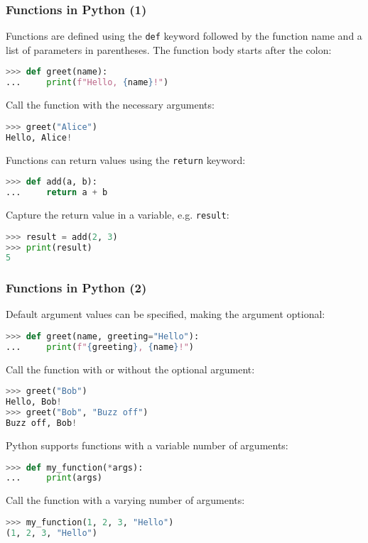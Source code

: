 \begin{frame}[fragile]
  \frametitle{Functions in Python (1)}
  Functions are defined using the \lstinline{def} keyword followed by the function name and a list of parameters in parentheses. The function body starts after the colon:
  \begin{lstlisting}[language=Python, numbers=none]
>>> def greet(name):
...     print(f"Hello, {name}!")
  \end{lstlisting}\pause
  Call the function with the necessary arguments:
  \begin{lstlisting}[language=Python, numbers=none]
>>> greet("Alice")
Hello, Alice!
  \end{lstlisting}\pause
  Functions can return values using the \lstinline{return} keyword:
  \begin{lstlisting}[language=Python, numbers=none]
>>> def add(a, b):
...     return a + b
  \end{lstlisting}\pause
  Capture the return value in a variable, e.g. \lstinline|result|:
  \begin{lstlisting}[language=Python, numbers=none]
>>> result = add(2, 3)
>>> print(result)
5
  \end{lstlisting}
\end{frame}

\begin{frame}[fragile]
  \frametitle{Functions in Python (2)}
  Default argument values can be specified, making the argument optional:
  \begin{lstlisting}[language=Python, numbers=none]
>>> def greet(name, greeting="Hello"):
...     print(f"{greeting}, {name}!")
  \end{lstlisting}\pause
  Call the function with or without the optional argument:
  \begin{lstlisting}[language=Python, numbers=none]
>>> greet("Bob")
Hello, Bob!
>>> greet("Bob", "Buzz off")
Buzz off, Bob!
  \end{lstlisting}\pause
  Python supports functions with a variable number of arguments:
  \begin{lstlisting}[language=Python, numbers=none]
>>> def my_function(*args):
...     print(args)
  \end{lstlisting}\pause
  Call the function with a varying number of arguments:
  \begin{lstlisting}[language=Python, numbers=none]
>>> my_function(1, 2, 3, "Hello")
(1, 2, 3, "Hello")
  \end{lstlisting}
\end{frame}

